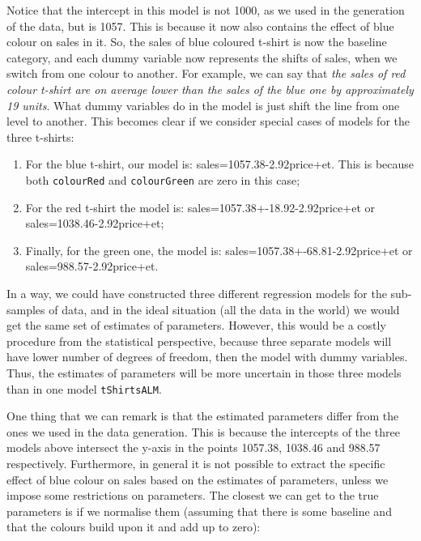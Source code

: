 \documentclass[
]{book}
\providecommand{\tightlist}{%
  \setlength{\itemsep}{0pt}\setlength{\parskip}{0pt}}
\theoremstyle{definition}
\theoremstyle{definition}
\theoremstyle{definition}
\theoremstyle{definition}
\theoremstyle{remark}
\begin{document}
Notice that the intercept in this model is not 1000, as we used in the generation of the data, but is 1057. This is because it now also contains the effect of blue colour on sales in it. So, the sales of blue coloured t-shirt is now the baseline category, and each dummy variable now represents the shifts of sales, when we switch from one colour to another. For example, we can say that \emph{the sales of red colour t-shirt are on average lower than the sales of the blue one by approximately 19 units}. What dummy variables do in the model is just shift the line from one level to another. This becomes clear if we consider special cases of models for the three t-shirts:

\begin{enumerate}
\def\labelenumi{\arabic{enumi}.}
\tightlist
\item
  For the blue t-shirt, our model is: sales=1057.38-2.92price+et. This is because both \texttt{colourRed} and \texttt{colourGreen} are zero in this case;
\item
  For the red t-shirt the model is: sales=1057.38+-18.92-2.92price+et or sales=1038.46-2.92price+et;
\item
  Finally, for the green one, the model is: sales=1057.38+-68.81-2.92price+et or sales=988.57-2.92price+et.
\end{enumerate}

In a way, we could have constructed three different regression models for the sub-samples of data, and in the ideal situation (all the data in the world) we would get the same set of estimates of parameters. However, this would be a costly procedure from the statistical perspective, because three separate models will have lower number of degrees of freedom, then the model with dummy variables. Thus, the estimates of parameters will be more uncertain in those three models than in one model \texttt{tShirtsALM}.

One thing that we can remark is that the estimated parameters differ from the ones we used in the data generation. This is because the intercepts of the three models above intersect the y-axis in the points 1057.38, 1038.46 and 988.57 respectively. Furthermore, in general it is not possible to extract the specific effect of blue colour on sales based on the estimates of parameters, unless we impose some restrictions on parameters. The closest we can get to the true parameters is if we normalise them (assuming that there is some baseline and that the colours build upon it and add up to zero):
\end{document}
